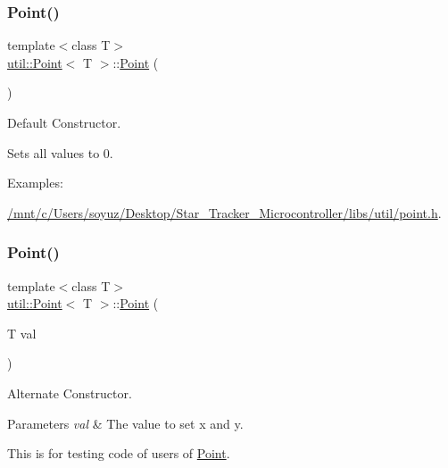 \subsubsection{\texorpdfstring{Point()}{Point()}\hspace{0.1cm}{\footnotesize\ttfamily [1/5]}}
{\footnotesize\ttfamily template$<$class T$>$ \\
\hyperlink{classutil_1_1Point}{util\+::\+Point}$<$ T $>$\+::\hyperlink{classutil_1_1Point}{Point} (\begin{DoxyParamCaption}{ }\end{DoxyParamCaption})\hspace{0.3cm}{\ttfamily [inline]}}



Default Constructor. 

Sets all values to 0. \begin{Desc}
\item[Examples\+: ]\par
\hyperlink{_2mnt_2c_2Users_2soyuz_2Desktop_2Star_Tracker_Microcontroller_2libs_2util_2point_8h-example}{/mnt/c/\+Users/soyuz/\+Desktop/\+Star\+\_\+\+Tracker\+\_\+\+Microcontroller/libs/util/point.\+h}.\end{Desc}
\mbox{\label{classutil_1_1Point_a3729f87defc02c0c428f99ffdadb1385}} 
\subsubsection{\texorpdfstring{Point()}{Point()}\hspace{0.1cm}{\footnotesize\ttfamily [2/5]}}
{\footnotesize\ttfamily template$<$class T$>$ \\
\hyperlink{classutil_1_1Point}{util\+::\+Point}$<$ T $>$\+::\hyperlink{classutil_1_1Point}{Point} (\begin{DoxyParamCaption}\item[{T}]{val }\end{DoxyParamCaption})\hspace{0.3cm}{\ttfamily [inline]}}



Alternate Constructor. 


\begin{DoxyParams}{Parameters}
{\em val} & The value to set x and y.\\
\hline
\end{DoxyParams}
This is for testing code of users of \hyperlink{classutil_1_1Point}{Point}. \mbox{\label{classutil_1_1Point_a7198b421e0d0bbca0672e940565af36a}} 
